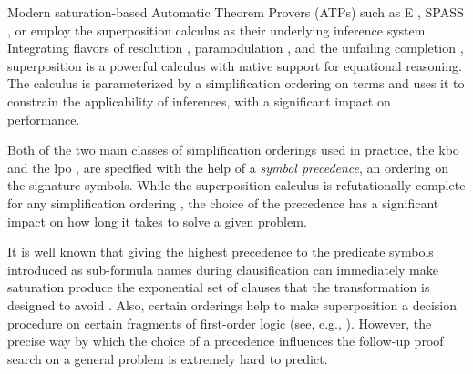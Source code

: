 




Modern saturation-based Automatic Theorem Provers (ATPs) such as E \cite{Schulz2019}, SPASS \cite{DBLP:conf/cade/WeidenbachDFKSW09},
or \Vampire{} \cite{DBLP:conf/cav/KovacsV13}
employ the superposition calculus \cite{DBLP:journals/logcom/BachmairG94,DBLP:books/el/RV01/NieuwenhuisR01} as their underlying inference system.
Integrating flavors of resolution \cite{DBLP:books/el/RV01/BachmairG01}, paramodulation \cite{Robinson1983}, and 
the unfailing completion \cite{Bachmair89completionwithout}, superposition is a powerful calculus with 
native support for equational reasoning. The calculus is parameterized by a simplification ordering on terms %
and uses it to constrain the applicability of inferences, with a significant impact on performance.

Both of the two main classes of simplification orderings used in practice,
the \acrlong*{kbo} \cite{Knuth1983}
and the \acrlong*{lpo} \cite{Kamin1980},
are specified with the help of a 
\emph{symbol precedence}, an ordering on the signature symbols. %
While the superposition calculus is refutationally complete for any simplification ordering \cite{DBLP:journals/logcom/BachmairG94},
the choice of the precedence has a significant impact on how long it takes to solve a given problem.

It is well known that giving the highest precedence to the predicate symbols introduced as sub-formula names 
during clausification \cite{DBLP:books/el/RV01/NonnengartW01}
can immediately make saturation produce the exponential 
set of clauses that the transformation is designed to avoid \cite{Reger2016}.
Also, certain orderings help to make superposition a decision procedure on certain fragments of first-order logic 
(see, e.g., \cite{DBLP:conf/lics/GanzingerN99,DBLP:conf/cade/HustadtKS05}).
However, the precise way by which the choice of a precedence 
influences the follow-up proof search on a general problem is extremely hard to predict. %

